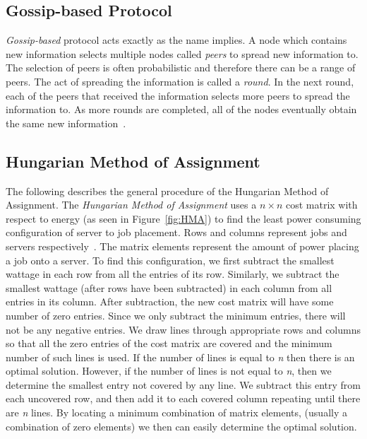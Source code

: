 \documentclass{sig-alternate}
\begin{document}
\subsection{Gossip-based Protocol}
\label{sec:GBP}

\emph{Gossip-based} protocol acts exactly as the name implies. A node which contains new information selects multiple nodes called \emph{peers} to spread new information to. The selection of peers is often probabilistic and therefore there can be a range of peers. The act of spreading the information is called a \emph{round}. In the next round, each of the peers that received the information selects more peers to spread the information to. As more rounds are completed, all of the nodes eventually obtain the same new information~\cite{Yanggratoke}.

\subsection{Hungarian Method of Assignment}
\label{sec:HMA}

The following describes the general procedure of the Hungarian Method of Assignment. The \emph{Hungarian Method of Assignment} uses a $n \times n$ cost matrix with respect to energy (as seen in Figure~\ref{fig:HMA}) to find the least power consuming configuration of server to job placement. Rows and columns represent jobs and servers respectively~\cite{Han}. The matrix elements represent the amount of power placing a job onto a server. To find this configuration, we first subtract the smallest wattage in each row from all the entries of its row. Similarly, we subtract the smallest wattage (after rows have been subtracted) in each column from all entries in its column. After subtraction, the new cost matrix will have some number of zero entries. Since we only subtract the minimum entries, there will not be any negative entries. We draw lines through appropriate rows and columns so that all the zero entries of the cost matrix are covered and the minimum number of such lines is used.  If the number of lines is equal to \emph{n} then there is an optimal solution. However, if the number of lines is not equal to \emph{n}, then we determine the smallest entry not covered by any line. We subtract this entry from each uncovered row, and then add it to each covered column repeating until there are \emph{n} lines. By locating a minimum combination of matrix elements, (usually a combination of zero elements) we then can easily determine the optimal solution.  
\end{document}
